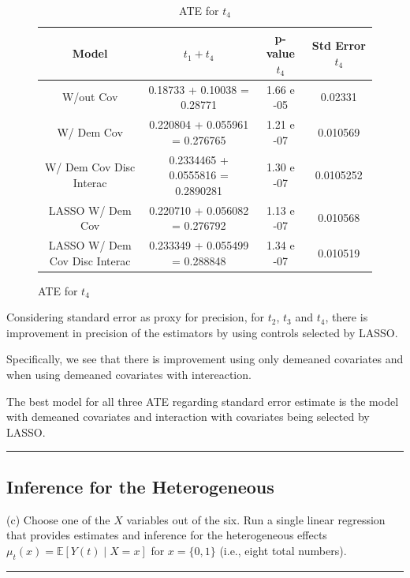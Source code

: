 \documentclass{article}
\newenvironment{colorparagraph}[1]{\par\color{#1}}{\par}
\begin{document}
\begin{figure}[H]
\begin{table}[H]
  \centering
  \label{tab:}
  \begin{tabular}{|cccc|}
    \hline
    Model & $t_1 + t_4$ & p-value $t_4$ & Std Error $t_4$ \\
    \hline
    W/out Cov                & 0.18733 + 0.10038 = 0.28771 & 1.66 e -05          & 0.02331 \\
    W/ Dem Cov               & 0.220804 + 0.055961 = 0.276765 & 1.21 e -07       & 0.010569 \\ 
    W/ Dem Cov Disc Interac  & 0.2334465 + 0.0555816 = 0.2890281 & 1.30 e -07    & 0.0105252 \\   
    LASSO W/ Dem Cov               & 0.220710 + 0.056082 = 0.276792 & 1.13 e -07 & 0.010568 \\       
    LASSO W/ Dem Cov Disc Interac  & 0.233349 + 0.055499 = 0.288848 & 1.34 e -07 & 0.010519 \\       
    \hline
  \end{tabular}
  \caption{ATE for $t_4$}
\end{table}
\end{figure}

Considering standard error as proxy for precision, for $t_2$, $t_3$ and $t_4$, there is improvement in precision of the estimators by using controls selected by LASSO.

Specifically, we see that there is improvement using only demeaned covariates and when using demeaned covariates with intereaction.

The best model for all three ATE regarding standard error estimate is the model with demeaned covariates and interaction with covariates being selected by LASSO.

\begin{colorparagraph}{questioncolor}
\label{q3c}
\rule{\textwidth}{0.5pt}
\subsection{Inference for the Heterogeneous}
(c) Choose one of the \( X \) variables out of the six. Run a single linear regression that provides estimates and inference for the heterogeneous effects \( \mu_t(x) = \mathbb{E}[Y(t) \mid X = x] \) for \( x = \{0, 1\} \) (i.e., eight total numbers).

\rule{\textwidth}{0.5pt}
\end{colorparagraph}
\end{document}
